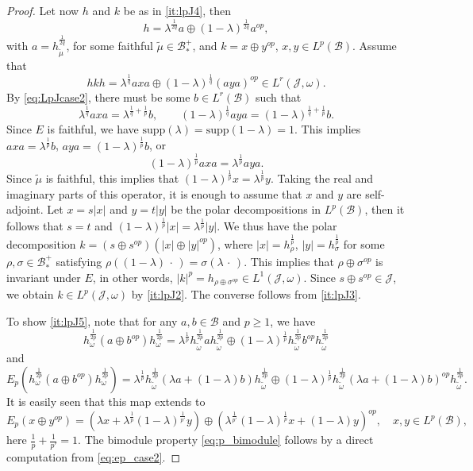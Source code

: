 \documentclass[12pt]{article}
\def\Je{\mathcal J}
\def\Be{\mathcal B}
\def\supp{\mathrm{supp}}
\theoremstyle{definition}
\theoremstyle{remark}
\begin{document}
\begin{proof}
Let now $h$ and $k$ be as in \ref{it:lpJ4}, then 
\[
h=\lambda^{\frac1{2q}}a\oplus
(1-\lambda)^{\frac1{2q}}a^{op},
\]
with $a=h_{\tilde\mu}^{\frac1{2q}}$, for some faithful $\tilde\mu\in \Be_*^+$, and
$k=x\oplus y^{op}$, $x,y\in L^p(\Be)$.
 Assume that 
\[
hkh=\lambda^{\frac1q}axa\oplus (1-\lambda)^{\frac1q}(aya)^{op}\in L^r(\Je,\omega).
\]
By \eqref{eq:LpJcase2}, there must be some $b\in L^r(\Be)$ such that 
\[
\lambda^{\frac1q}axa=\lambda^{\frac1q+\frac1p}b,\qquad
(1-\lambda)^{\frac1q}aya=(1-\lambda)^{\frac1q+\frac1p}b.
\]
Since $E$ is faithful, we have $\supp(\lambda)=\supp(1-\lambda)=1$.  This implies 
$axa=\lambda^{\frac1p}b$, $aya=(1-\lambda)^{\frac1p}b$, or 
\[
(1-\lambda)^{\frac1p}axa=\lambda^{\frac1p}aya.
\]
Since $\tilde \mu$ is faithful, this implies that
$(1-\lambda)^{\frac1p}x=\lambda^{\frac1p}y$. Taking the real and imaginary parts of this
operator, it is enough to assume that $x$ and $y$ are self-adjoint. Let $x=s|x|$ and $y=t|y|$ be the polar
decompositions in $L^{p}(\Be)$, then it follows 
that $s=t$ and $(1-\lambda)^{\frac1p}|x|=\lambda^{\frac1p}|y|$.
We thus have the polar decomposition $k=(s\oplus s^{op})(|x|\oplus |y|^{op})$, where
$|x|=h_{\rho}^{\frac1p}$, $|y|=h_\sigma^{\frac1p}$ for some $\rho,\sigma\in \Be_*^+$
satisfying $\rho((1-\lambda)\,\cdot\, )=\sigma(\lambda\,\cdot\,)$. This  implies that $\rho\oplus \sigma^{op}$ is invariant under $E$, in
other words, $|k|^p=h_{\rho\oplus \sigma^{op}}\in L^1(\Je,\omega)$. Since $s\oplus s^{op}
\in \Je$, we obtain $k\in L^p(\Je,\omega)$ by \ref{it:lpJ2}. The converse follows from
\ref{it:lpJ3}. 

To show \ref{it:lpJ5}, note that for any $a,b\in \Be$ and $p\ge 1$, we have
\[
h_\omega^{\frac1{2p}}(a\oplus b^{op})h_\omega^{\frac1{2p}}=\lambda^{\frac1p}h_{\tilde
\omega}^{\frac1{2p}}ah_{\tilde \omega}^{\frac1{2p}}\oplus (1-\lambda)^{\frac1p}h_{\tilde
\omega}^{\frac1{2p}}b^{op}h_{\tilde \omega}^{\frac1{2p}}
\]
and
\[
E_p(h_\omega^{\frac1{2p}}(a\oplus b^{op})h_\omega^{\frac1{2p}})=\lambda^{\frac1p}h_{\tilde
\omega}^{\frac1{2p}}(\lambda a+(1-\lambda)b)h_{\tilde \omega}^{\frac1{2p}}\oplus (1-\lambda)^{\frac1p}h_{\tilde
\omega}^{\frac1{2p}}(\lambda a+(1-\lambda)b)^{op}h_{\tilde \omega}^{\frac1{2p}}.
\]
It is easily seen that this map extends to
\begin{equation}\label{eq:ep_case2}
E_p(x\oplus y^{op})=(\lambda x+ \lambda^{\frac1p}(1-\lambda)^{\frac1{p'}}y)\oplus
(\lambda^{\frac1{p'}}(1-\lambda)^{\frac1p}x+(1-\lambda)y)^{op},\quad x,y\in L^p(\Be),
\end{equation}
here $\frac1p+\frac1{p'}=1$. The bimodule property \eqref{eq:p_bimodule} follows by a
direct computation from \eqref{eq:ep_case2}.



\end{proof}
\end{document}
